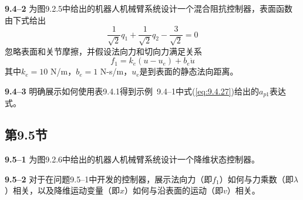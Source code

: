 \documentclass[12pt,a4paper]{ctexart}
\begin{document}
\textbf{9.4--2} 为图9.2.5中给出的机器人机械臂系统设计一个混合阻抗控制器，表面函数由下式给出
\[
\frac{1}{\sqrt{2}}q_1 + \frac{1}{\sqrt{2}}q_2 - \frac{3}{\sqrt{2}} = 0
\]
忽略表面和关节摩擦，并假设法向力和切向力满足关系
\[
f_1 = k_e(u - u_e) + b_e \dot{u}
\]
其中$k_e = 10$ N/m，$b_e = 1$ N-s/m，$u_e$是到表面的静态法向距离。

\textbf{9.4--3} 明确展示如何使用表9.4.1得到示例~9.4--1中式(\ref{eq:9.4.27})给出的$a_{p1}$表达式。

\subsection*{第9.5节}

\textbf{9.5--1} 为图9.2.6中给出的机器人机械臂系统设计一个降维状态控制器。

\textbf{9.5--2} 对于在问题9.5--1中开发的控制器，展示法向力（即$f_1$）如何与力乘数（即$\lambda$）相关，以及降维运动变量（即$x$）如何与沿表面的运动（即$v$）相关。

\ifstandalone
  
\end{document}
